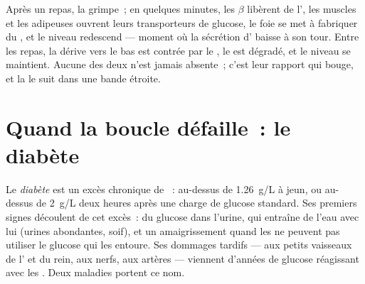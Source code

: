\begin{example}\label{ex:g12:glucose-and-diabetes:loop}
Après un repas, la  grimpe~; en quelques minutes, les 
$\beta$ libèrent de l', les muscles et les  adipeuses
ouvrent leurs transporteurs de glucose, le foie se met à fabriquer du
, et le niveau redescend --- moment où la sécrétion
d' baisse à son tour. Entre les repas, la dérive vers le bas
est contrée par le , le  est dégradé, et le niveau se
maintient. Aucune des deux  n'est jamais absente~; c'est leur
rapport qui bouge, et la  le suit dans une bande étroite.
\end{example}

\section{Quand la boucle défaille~: le diabète}

\begin{definition}[Diabète]\label{def:g12:glucose-and-diabetes:diabetes}
Le \emph{diabète} est un excès chronique de ~:
au-dessus de \qty{1.26}{g/L} à jeun, ou au-dessus de \qty{2}{g/L} deux
heures après une charge de glucose standard. Ses premiers signes
découlent de cet excès~: du glucose dans l'urine, qui entraîne de
l'eau avec lui (urines abondantes, soif), et un amaigrissement quand
les  ne peuvent pas utiliser le glucose qui les entoure. Ses
dommages tardifs --- aux petits vaisseaux de l' et du rein, aux
nerfs, aux artères --- viennent d'années de glucose réagissant avec
les . Deux maladies portent ce nom.
\end{definition}

